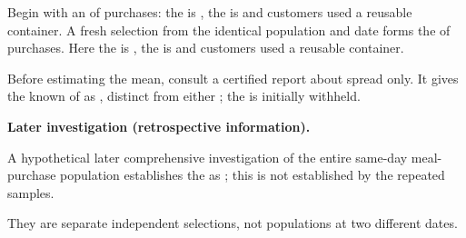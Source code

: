 \begin{probleminfoexcerpt}
Begin with an     of  purchases: the    is   , the    is    and  customers used a reusable container. A fresh selection from the identical population and date forms the     of  purchases. Here the    is   , the    is    and  customers used a reusable container.
\end{probleminfoexcerpt}

\begin{probleminfoexcerpt}
Before estimating the mean, consult a certified report about spread only. It gives the known    of  as   , distinct from either   ; the   is initially withheld.
\end{probleminfoexcerpt}

\textbf{Later investigation (retrospective information).}

\begin{probleminfoexcerpt}
A hypothetical later comprehensive investigation of the entire same-day meal-purchase population establishes the   as   ; this is not established by the repeated samples.
\end{probleminfoexcerpt}

They are separate independent selections, not populations at two different dates.

